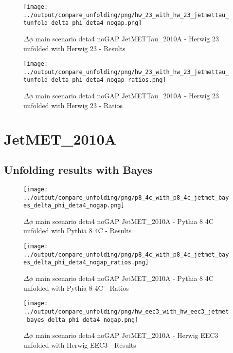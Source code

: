 \documentclass[11pt]{book}
\begin{document}
\begin{figure}[ht]
\centering
\texttt{[image: ../output/compare\_unfolding/png/hw\_23\_with\_hw\_23\_jetmettau\_tunfold\_delta\_phi\_deta4\_nogap.png]}
\caption{$\Delta\phi$ main scenario deta4 noGAP JetMETTau\_2010A - Herwig 23 unfolded with Herwig 23 - Results}
\label{hw_23_hw_23_jetmettau_tunfold_delta_phi_deta4_nogap_a}
\end{figure}

\begin{figure}[ht]
\centering
\texttt{[image: ../output/compare\_unfolding/png/hw\_23\_with\_hw\_23\_jetmettau\_tunfold\_delta\_phi\_deta4\_nogap\_ratios.png]}
\caption{$\Delta\phi$ main scenario deta4 noGAP JetMETTau\_2010A - Herwig 23 unfolded with Herwig 23 - Ratios}
\label{hw_23_hw_23_jetmettau_tunfold_delta_phi_deta4_nogap_b}
\end{figure}


\clearpage
\section{JetMET\_2010A}
\subsection{Unfolding results with Bayes}

\begin{figure}[ht]
\centering
\texttt{[image: ../output/compare\_unfolding/png/p8\_4c\_with\_p8\_4c\_jetmet\_bayes\_delta\_phi\_deta4\_nogap.png]}
\caption{$\Delta\phi$ main scenario deta4 noGAP JetMET\_2010A - Pythia 8 4C unfolded with Pythia 8 4C - Results}
\label{p8_p8_jetmet_bayes_delta_phi_deta4_nogap_a}
\end{figure}

\begin{figure}[ht]
\centering
\texttt{[image: ../output/compare\_unfolding/png/p8\_4c\_with\_p8\_4c\_jetmet\_bayes\_delta\_phi\_deta4\_nogap\_ratios.png]}
\caption{$\Delta\phi$ main scenario deta4 noGAP JetMET\_2010A - Pythia 8 4C unfolded with Pythia 8 4C - Ratios}
\label{p8_p8_jetmet_bayes_delta_phi_deta4_nogap_b}
\end{figure}

\begin{figure}[ht]
\centering
\texttt{[image: ../output/compare\_unfolding/png/hw\_eec3\_with\_hw\_eec3\_jetmet\_bayes\_delta\_phi\_deta4\_nogap.png]}
\caption{$\Delta\phi$ main scenario deta4 noGAP JetMET\_2010A - Herwig EEC3 unfolded with Herwig EEC3 - Results}
\label{hw_eec3_hw_eec3_jetmet_bayes_delta_phi_deta4_nogap_a}
\end{figure}
\end{document}
